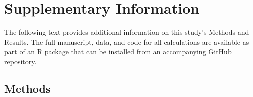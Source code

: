 \documentclass[12pt]{article}
\newcommand{\beginsupplement}{%
        \setcounter{table}{0}
        \renewcommand{\thetable}{S\arabic{table}}%
        \setcounter{figure}{0}
        \renewcommand{\thefigure}{S\arabic{figure}}%
     }
\begin{document}
 
\beginsupplement

\linenumbers
\baselineskip24pt

\section*{Supplementary Information}%

The following text provides additional information on this study's Methods and Results.  The full manuscript, data, and code for all calculations are available as part of an R package that can be installed from an accompanying \href{https://github.com/agroimpacts/ecoscales}{GitHub repository}.

\subsection*{Methods}%
\end{document}
